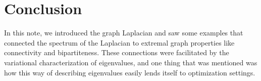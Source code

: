\section{Conclusion}

In this note, we introduced the graph Laplacian and saw some examples that connected the spectrum of the Laplacian to extremal graph properties like connectivity and bipartiteness. These connections were facilitated by the variational characterization of eigenvalues, and one thing that was mentioned was how this way of describing eigenvalues easily lends itself to optimization settings.  